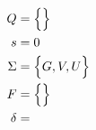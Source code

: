 \documentclass[12pt,a4paper]{report}
\begin{document}
	\begin{align*}
		Q &= \Bigl\{\Bigl\} \\
		s &= 0 \\
		\Sigma &= \Bigl\{G, V, U\Bigl\}\\
		F &= \Bigl\{\Bigl\}\\
		\delta &= \\
	\end{align*}
\end{document}
